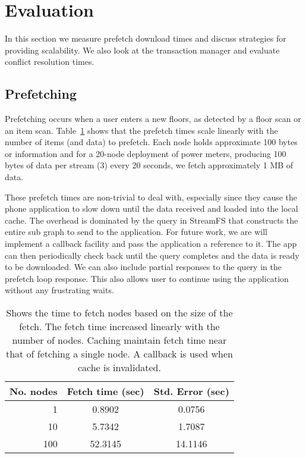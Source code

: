 \section{Evaluation}
\label{sec:eval}
In this section we measure prefetch download times and discuss strategies for providing scalability.  We also
look at the transaction manager and evaluate conflict resolution times.



\subsection{Prefetching}
Prefetching occurs when a user enters a new floors, as detected by a floor scan or an item
scan.  Table~\ref{tab:prefetchtimes} shows that the prefetch times scale linearly with the number of
items (and data) to prefetch.  Each node holds approximate 100 bytes or information and for
a 20-node deployment of power meters, producing 100 bytes of data per stream (3) every 20 seconds, we fetch 
approximately 1 MB of data.

These prefetch times are non-trivial to deal with, especially since they cause the phone application to slow down
until the data received and loaded into the local cache.  The overhead is dominated by the query in StreamFS that 
constructs the entire sub graph to send to the application.  For future work,  we are will implement a
callback facility and pass the application a reference to it.  The app can then periodically check back until
the query completes and the data is ready to be downloaded.  We can also include partial responses to the query
in the prefetch loop response.  This also allows user to continue using the application without any frustrating waits.

\begin{table}
\begin{center}
  \begin{tabular}{| r | c  c | }
    \hline
    {\bf No. nodes } & {\bf Fetch time (sec) } & {\bf Std. Error (sec)} \\ \hline
    1 & 0.8902 & 0.0756 \\ \hline
    10 & 5.7342 & 1.7087 \\ \hline
    100 & 52.3145 & 14.1146 \\ 
    \hline
  \end{tabular}
\caption{Shows the time to fetch nodes based on the size of the fetch.  The fetch time
increased linearly with the number of nodes.  Caching maintain fetch time near
that of fetching a single node.  A callback is used when cache is invalidated.}
\label{tab:prefetchtimes}
\end{center}
\end{table}


